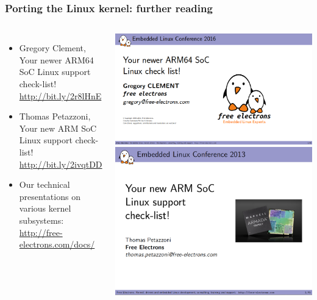\begin{frame}
  \frametitle{Porting the Linux kernel: further reading}
  \begin{columns}
    \begin{itemize}
    \item Gregory Clement, Your newer ARM64 SoC Linux support check-list!\\
          \url{http://bit.ly/2r8lHnE}
    \item Thomas Petazzoni, Your new ARM SoC Linux support check-list!\\
          \url{http://bit.ly/2ivqtDD}
    \item Our technical presentations on various kernel subsystems:\\
          \url{http://free-electrons.com/docs/}
    \end{itemize}
    \includegraphics[width=\textwidth]{slides/kernel-porting-content/arm64-soc-support-checklist.png}\\
    \includegraphics[width=\textwidth]{slides/kernel-porting-content/arm-soc-support-checklist.png}
  \end{columns}
\end{frame}
